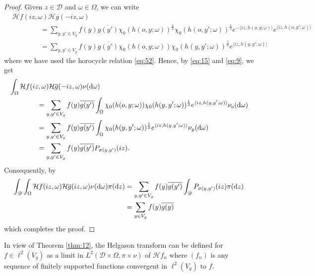 \documentclass[11pt]{amsart}
\newcommand{\calH}{\mathcal{H}}
\newcommand{\scrD}{\mathscr{D}}
\newcommand{\sprod}[2]{\langle {#1}, {#2} \rangle}
\theoremstyle{plain}
\newcounter{thm}
\theoremstyle{definition}
\numberwithin{equation}{section}
\begin{document}
\begin{proof}
	Given $z \in \scrD$ and $\omega \in \Omega$, we can write
	\begin{align*}
		&\calH f(i z, \omega) \calH \overline{g}( -i z, \omega) \\
		&\qquad\qquad=
		\sum_{y, y' \in V_g} f(y) \overline{g(y')} 
		\chi_0(h(o, y; \omega))^{\frac12} \chi_0(h(o, y'; \omega))^{\frac12} e^{-\sprod{i z}{h(o, y; \omega)}}
		e^{\sprod{i z}{h(o, y'; \omega)}} \\
		&\qquad\qquad=
		\sum_{y, y' \in V_g} f(y) \overline{g(y')}
		\chi_0(h(o, y; \omega)) \chi_0(h(y, y'; \omega))^{\frac12}
		e^{\sprod{iz}{h(y, y'; \omega)}} 
	\end{align*}
	where we have used the horocycle relation \eqref{eq:52}. Hence, by \eqref{eq:15} and \eqref{eq:9}, we get
	\begin{align*}
		&\int_\Omega \calH f(iz, \omega) \calH \overline{g}( -i z, \omega) \nu({\rm d} \omega) \\
		&\qquad\qquad=
		\sum_{y, y' \in V_g} f(y) \overline{g(y')}
		\int_\Omega \chi_0(h(o, y; \omega)) \chi_0(h(y, y'; \omega))^{\frac12} e^{\sprod{i z}{h(y, y'; \omega)}}
		\nu_o({\rm d} \omega) \\
		&\qquad\qquad=
		\sum_{y, y' \in V_g} f(y) \overline{g(y')}
		\int_\Omega \chi_0(h(y, y'; \omega))^{\frac12} e^{\sprod{i z}{h(y, y'; \omega)}} \nu_y({\rm d} \omega) \\
		&\qquad\qquad=
		\sum_{y, y' \in V_g} f(y) \overline{g(y')} P_{\sigma(y, y')}(i z).
	\end{align*}
	Consequently, by \cite[Lemma 6.1]{park2}
	\begin{align*}
		\int_{\scrD} \int_\Omega \calH f(i z, \omega) \calH \overline{g}(i z, \omega) \nu({\rm d} \omega)
		\pi({\rm d} z)
		&=
		\sum_{y, y' \in V_g} f(y) \overline{g(y')}
		\int_\scrD P_{\sigma(y, y')}(i z) \pi({\rm d} z) \\
		&=
		\sum_{y \in V_g} f(y) \overline{g(y)}
	\end{align*}
	which completes the proof. 
\end{proof}

In view of Theorem \ref{thm:12}, the Helgason transform can be defined for $f \in \ell^2(V_g)$ as a limit in 
$L^2(\scrD \times \Omega, \pi \times \nu)$ of $\calH f_n$ where $(f_n)$ is any sequence of finitely supported functions
convergent in $\ell^2(V_g)$ to $f$. 
\end{document}
